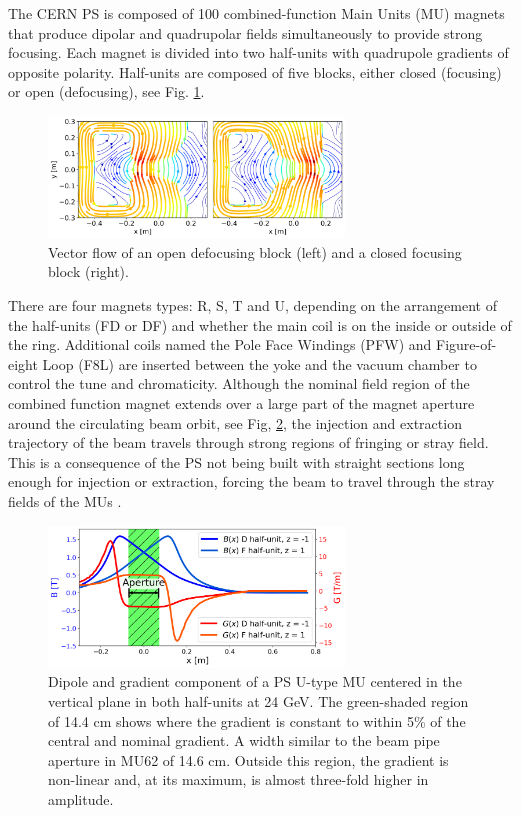 The CERN PS is composed of 100 combined-function Main Units (MU) magnets that produce dipolar and quadrupolar fields simultaneously to provide strong focusing. Each magnet is divided into two half-units with quadrupole gradients of opposite polarity. Half-units are composed of five blocks, either closed (focusing) or open (defocusing), see Fig. \ref{fig:vector_flow}.
\\

\begin{figure}[H]
\centering
\includegraphics[width=0.7\textwidth]{01_Introduction/images/vector_flow.png}
\caption{Vector flow of an open defocusing block (left) and a closed focusing block (right).}
\label{fig:vector_flow}
\end{figure}

There are four magnets types: R, S, T and U, depending on the arrangement of the half-units (FD or DF) and whether the main coil is on the inside or outside of the ring. Additional coils named the Pole Face Windings (PFW) and Figure-of-eight Loop (F8L) are inserted between the yoke and the vacuum chamber to control the tune and chromaticity. Although the nominal field region of the combined function
magnet extends over a large part of the magnet aperture around the circulating beam orbit, see Fig, \ref{fig:dipole_gradient_components}, the injection and extraction trajectory of the beam travels through strong regions of fringing or stray field. This is a consequence of the PS not being built with straight sections long enough for injection or extraction, forcing the beam to travel through the stray fields of the MUs \cite{risselada_beam_nodate}.
 
\begin{figure}[H]
\centering
\includegraphics[width=0.7\textwidth]{01_Introduction/images/dipole_gradient_components.png}
\caption{Dipole and gradient component of a PS U-type MU centered in the vertical plane in both half-units at 24 GeV. The green-shaded region of 14.4 cm shows where the gradient is constant to within 5\% of the central and nominal gradient. A width similar to the beam pipe aperture in MU62 of 14.6 cm. Outside this region, the gradient is non-linear and, at its maximum, is almost three-fold higher in amplitude.}
\label{fig:dipole_gradient_components}
\end{figure}

